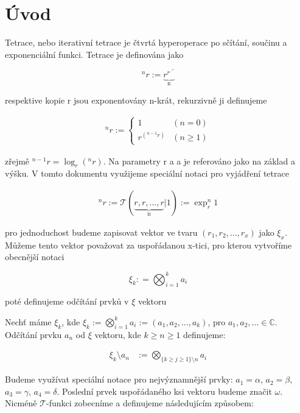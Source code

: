 \section{Úvod}

Tetrace, nebo iterativní tetrace je čtvrtá hyperoperace
\cite{24} po sčítání, součinu a exponenciální funkci. 
Tetrace je definována jako 

\[^nr := \underbrace{r^{r^{\iddots^{r}}}}_{\text{n}} \]

respektive kopie r jsou exponentovány n-krát, 
rekurzivně ji definujeme

\begin{align}
      ^n r :=\left\{ 
      \begin{array}{ll}
            1 & (n = 0) \\
            r^{\left( ^{n-1}r
            \right)} & (n \geq 1)
      \end{array} \right.
\end{align}

zřejmě \(^{n-1}r = \log_r(^n r)\). Na parametry r a
a je referováno jako na základ a výšku. V tomto dokumentu
využijeme speciální notaci pro vyjádření tetrace

\begin{align}
      ^n r:= \mathcal{T}(\underbrace{r, r, ..., 
      r}_{\text{n}} | 1) := \exp_r^n 1
\end{align}

pro jednoduchost budeme zapisovat vektor ve tvaru 
\((r_1, r_2, ..., r_x)\) jako \(\xi_x\). Můžeme tento
vektor považovat za uspořádanou x-tici, pro kterou
vytvoříme obecnější notaci \cite{28}

\[\xi_k: = \bigotimes_{i=1}^k a_i \]

poté definujeme odčítání prvků v \(\xi\) vektoru
\begin{definition}
      Nechť máme \(\xi_k\), kde \(\xi_k :=\bigotimes_{i=1}^k 
      a_i := (a_1, a_2, ..., a_k)\), pro \(a_1, a_2, ... \in 
      \mathbb{C}\). Odčítání prvku \(a_n\) od \(\xi\) vektoru,
      kde \(k \geq n \geq 1\) definujeme:

      \begin{align}
            \xi_k \setminus a_n &:= \bigotimes_{\{k
            \geq j \geq 1\} \setminus n} a_i
      \end{align}
\end{definition}

Budeme využívat speciální notace pro nejvýznamnější prvky:
\(a_1 = \alpha\), \(a_2 = \beta\), \(a_3 = \gamma\), \(a_4 
= \delta\). Poslední prvek uspořádaného ksi vektoru budeme 
značit \(\omega\). Nicméně \(\mathcal{T}\)-funkci zobecníme
a definujeme následujícím způsobem:

